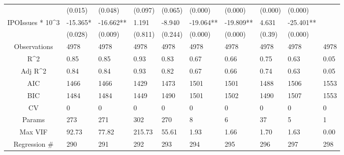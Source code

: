 \documentclass{article}
\begin{document}
\begin{table}[H]
\begin{tabular}{|clllllllll|}
   & (0.015) & (0.048) & (0.097) & (0.065) & (0.000) & (0.000) & (0.000) & (0.000) &  \\ 
  IPOIssues * 10^3 & -15.365* & -16.662** & 1.191 & -8.940 & -19.064** & -19.809** & 4.631 & -25.401** &  \\ 
   & (0.028) & (0.009) & (0.811) & (0.244) & (0.000) & (0.000) & (0.39) & (0.000) &  \\ 
  \hline 
 Observations & 4978 & 4978 & 4978 & 4978 & 4978 & 4978 & 4978 & 4978 & 4978 \\ 
  R^2 & 0.85 & 0.85 & 0.93 & 0.83 & 0.67 & 0.66 & 0.75 & 0.63 & 0.05 \\ 
  Adj R^2 & 0.84 & 0.84 & 0.93 & 0.82 & 0.67 & 0.66 & 0.74 & 0.63 & 0.05 \\ 
  AIC & 1466 & 1466 & 1429 & 1473 & 1501 & 1501 & 1488 & 1506 & 1553 \\ 
  BIC & 1484 & 1484 & 1449 & 1490 & 1501 & 1502 & 1490 & 1507 & 1553 \\ 
  CV & 0 & 0 & 0 & 0 & 0 & 0 & 0 & 0 & 0 \\ 
  Params & 273 & 271 & 302 & 270 & 8 & 6 & 37 & 5 & 1 \\ 
  Max VIF & 92.73 & 77.82 & 215.73 & 55.61 & 1.93 & 1.66 & 1.70 & 1.63 & 0.00 \\ 
  Regression \# & 290 & 291 & 292 & 293 & 294 & 295 & 296 & 297 & 298 \\ 
   \hline
\end{tabular}
 
\end{table}
\end{document}

